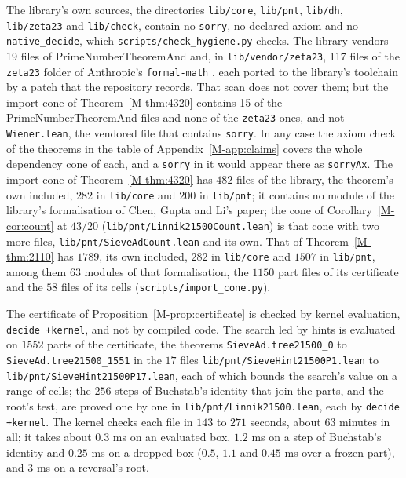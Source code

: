 \documentclass[11pt]{article}
\newcommand{\lean}[1]{\texttt{#1}}
\newcommand{\file}[1]{\nolinkurl{#1}}
\numberwithin{equation}{section}
\begin{document}
The library's own sources, the directories \texttt{lib/core}, \texttt{lib/pnt}, \texttt{lib/dh},
\texttt{lib/zeta23} and \texttt{lib/check}, contain no \lean{sorry}, no declared axiom and no \lean{native\_decide},
which \texttt{scripts/check\_hygiene.py} checks. The library vendors 19 files of PrimeNumberTheoremAnd \cite{pnt-plus}
and, in \texttt{lib/vendor/zeta23}, 117 files of the \texttt{zeta23} folder of Anthropic's \texttt{formal-math}
\cite{formal-math}, each ported to the
library's toolchain by a patch that the repository records. That scan does not cover them; but the import cone of
Theorem~\ref{M-thm:4320} contains 15 of the PrimeNumberTheoremAnd files and none of the \texttt{zeta23} ones, and not
\texttt{Wiener.lean}, the vendored file that contains \lean{sorry}. In any case the axiom check of the theorems in the
table of Appendix~\ref{M-app:claims} covers the whole dependency cone of each, and a \lean{sorry} in it would appear
there
as \lean{sorryAx}. The import cone of Theorem~\ref{M-thm:4320} has $482$ files of the library, the theorem's own
included, $282$ in \texttt{lib/core} and $200$ in \texttt{lib/pnt}; it contains no module of the library's
formalisation of Chen, Gupta and Li's paper; the cone of Corollary~\ref{M-cor:count} at $43/20$
(\file{lib/pnt/Linnik21500Count.lean}) is that cone with two more files, \file{lib/pnt/SieveAdCount.lean} and its
own. That of Theorem~\ref{M-thm:2110} has $1789$, its own included, $282$ in
\texttt{lib/core} and $1507$ in \texttt{lib/pnt}, among them $63$ modules of that formalisation, the $1150$ part files
of its certificate and the $58$
files of its cells (\texttt{scripts/import\_cone.py}).

The certificate of Proposition~\ref{M-prop:certificate} is checked by kernel evaluation, \lean{decide +kernel}, and not
by compiled code. The search led by hints is evaluated on $1552$ parts of the certificate, the theorems
\lean{SieveAd.tree21500\_0} to
\lean{SieveAd.tree21500\_1551} in the $17$ files \file{lib/pnt/SieveHint21500P1.lean} to
\file{lib/pnt/SieveHint21500P17.lean}, each of which bounds the search's value on a range of cells; the $256$ steps of
Buchstab's identity that join the parts, and the root's test, are proved one by one in \file{lib/pnt/Linnik21500.lean},
each by \lean{decide +kernel}. The kernel checks each file in $143$ to $271$ seconds, about $63$ minutes in all; it
takes about $0.3$ ms on an evaluated box, $1.2$ ms on a step of Buchstab's identity and $0.25$ ms on a dropped box
($0.5$, $1.1$ and $0.45$ ms over a frozen part), and $3$ ms on a reversal's root.
\end{document}
